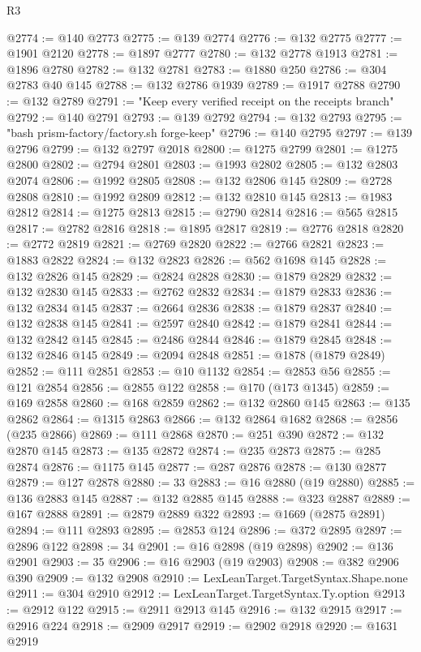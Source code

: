 \begin{lexlean}{R3}
\begin{coremodule}
@2774 := @140 @2773
@2775 := @139 @2774
@2776 := @132 @2775
@2777 := @1901 @2120
@2778 := @1897 @2777
@2780 := @132 @2778 @1913
@2781 := @1896 @2780
@2782 := @132 @2781
@2783 := @1880 @250
@2786 := @304 @2783 @40 @145
@2788 := @132 @2786 @1939
@2789 := @1917 @2788
@2790 := @132 @2789
@2791 := "Keep every verified receipt on the receipts branch"
@2792 := @140 @2791
@2793 := @139 @2792
@2794 := @132 @2793
@2795 := "bash prism-factory/factory.sh forge-keep"
@2796 := @140 @2795
@2797 := @139 @2796
@2799 := @132 @2797 @2018
@2800 := @1275 @2799
@2801 := @1275 @2800
@2802 := @2794 @2801
@2803 := @1993 @2802
@2805 := @132 @2803 @2074
@2806 := @1992 @2805
@2808 := @132 @2806 @145
@2809 := @2728 @2808
@2810 := @1992 @2809
@2812 := @132 @2810 @145
@2813 := @1983 @2812
@2814 := @1275 @2813
@2815 := @2790 @2814
@2816 := @565 @2815
@2817 := @2782 @2816
@2818 := @1895 @2817
@2819 := @2776 @2818
@2820 := @2772 @2819
@2821 := @2769 @2820
@2822 := @2766 @2821
@2823 := @1883 @2822
@2824 := @132 @2823
@2826 := @562 @1698 @145
@2828 := @132 @2826 @145
@2829 := @2824 @2828
@2830 := @1879 @2829
@2832 := @132 @2830 @145
@2833 := @2762 @2832
@2834 := @1879 @2833
@2836 := @132 @2834 @145
@2837 := @2664 @2836
@2838 := @1879 @2837
@2840 := @132 @2838 @145
@2841 := @2597 @2840
@2842 := @1879 @2841
@2844 := @132 @2842 @145
@2845 := @2486 @2844
@2846 := @1879 @2845
@2848 := @132 @2846 @145
@2849 := @2094 @2848
@2851 := @1878 (@1879 @2849)
@2852 := @111 @2851
@2853 := @10 @1132
@2854 := @2853 @56
@2855 := @121 @2854
@2856 := @2855 @122
@2858 := @170 (@173 @1345)
@2859 := @169 @2858
@2860 := @168 @2859
@2862 := @132 @2860 @145
@2863 := @135 @2862
@2864 := @1315 @2863
@2866 := @132 @2864 @1682
@2868 := @2856 (@235 @2866)
@2869 := @111 @2868
@2870 := @251 @390
@2872 := @132 @2870 @145
@2873 := @135 @2872
@2874 := @235 @2873
@2875 := @285 @2874
@2876 := @1175 @145
@2877 := @287 @2876
@2878 := @130 @2877
@2879 := @127 @2878
@2880 := 33
@2883 := @16 @2880 (@19 @2880)
@2885 := @136 @2883 @145
@2887 := @132 @2885 @145
@2888 := @323 @2887
@2889 := @167 @2888
@2891 := @2879 @2889 @322
@2893 := @1669 (@2875 @2891)
@2894 := @111 @2893
@2895 := @2853 @124
@2896 := @372 @2895
@2897 := @2896 @122
@2898 := 34
@2901 := @16 @2898 (@19 @2898)
@2902 := @136 @2901
@2903 := 35
@2906 := @16 @2903 (@19 @2903)
@2908 := @382 @2906 @390
@2909 := @132 @2908
@2910 := LexLeanTarget.TargetSyntax.Shape.none
@2911 := @304 @2910
@2912 := LexLeanTarget.TargetSyntax.Ty.option
@2913 := @2912 @122
@2915 := @2911 @2913 @145
@2916 := @132 @2915
@2917 := @2916 @224
@2918 := @2909 @2917
@2919 := @2902 @2918
@2920 := @1631 @2919

\end{coremodule}
\end{lexlean}
